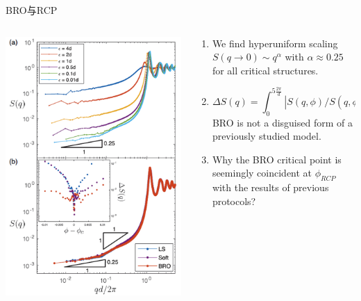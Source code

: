\documentclass{bredelebeamer}
\begin{document}
\begin{frame}{BRO与RCP}
\begin{columns}
\begin{column}{0.5\textwidth}
\includegraphics[scale=0.2]{images/p12.png}
\end{column}

\begin{column}{0.5\textwidth}
\begin{enumerate}[]
\item We find hyperuniform scaling $S(q \rightarrow 0) \sim q^{\alpha}$ with $\alpha \approx 0.25$ for all critical structures.
\item $$\Delta S(q)=\int_{0}^{5 \frac{2 \pi}{d}}\left|S(q, \phi) / S\left(q, \phi_{c}\right)-1\right| d q$$
BRO is not a disguised form of a previously studied model.
\item Why the BRO critical point is seemingly coincident at $\phi_{RCP}$ with the results of previous protocols?
\end{enumerate}
\end{column}
\end{columns}
\end{frame}
\end{document}
